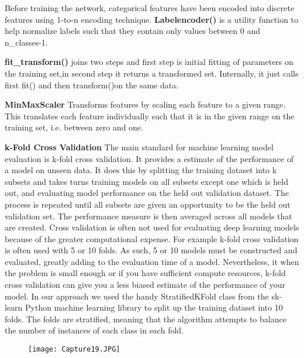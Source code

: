 Before training the network, categorical features have been encoded into discrete features using 1-to-n encoding technique.
\newline
\textbf{Labelencoder()} is a utility function to help normalize labels such that they contain only values between 0 and n\_classes-1.

\textbf{fit\_transform()} joins two steps and first step is  initial fitting of parameters on the training set,in second step it returns a transformed set. Internally, it just calls first fit() and then transform()on the same data.

\textbf{MinMaxScaler} Transforms features by scaling each feature to a given range.
This translates each feature individually such that it is in the given range on the training set, i.e. between zero and one.

\textbf{k-Fold Cross Validation} 
\newline
The main standard for machine learning model evaluation is k-fold cross validation.
It provides a estimate of the performance of a model on unseen data. It does this by splitting the training dataset into k subsets and takes turns training models on all subsets except one which is held out, and evaluating model performance on the held out validation dataset. The process is repeated until all subsets are given an opportunity to be the held out validation set. The performance measure is then averaged across all models that are created.
Cross validation is often not used for evaluating deep learning models because of the greater computational expense. For example k-fold cross validation is often used with 5 or 10 folds. As such, 5 or 10 models must be constructed and evaluated, greatly adding to the evaluation time of a model.
Nevertheless, it when the problem is small enough or if you have sufficient compute resources, k-fold cross validation can give you a less biased estimate of the performance of your model.
In our approach we used the handy StratifiedKFold class from the sk-learn Python machine learning library to split up the training dataset into 10 folds. The folds are stratified, meaning that the algorithm attempts to balance the number of instances of each class in each fold.

\newpage
\begin{figure}[h]
	\texttt{[image: Capture19.JPG]}
	\caption{}
	\label{fig:boat1}
\end{figure}

\newpage
